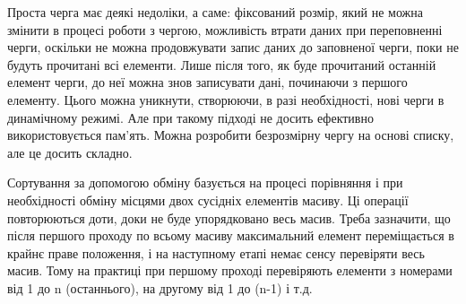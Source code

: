 \documentclass[a4paper,14pt]{extreport}
\begin{document}
Проста черга має деякі недоліки, а саме: фіксований розмір, який не можна змінити в процесі роботи з чергою, можливість втрати даних при переповненні черги, оскільки не можна продовжувати запис даних до заповненої черги, поки не будуть прочитані всі елементи. Лише після того, як буде прочитаний останній елемент черги, до неї можна знов записувати дані, починаючи з першого елементу. Цього можна уникнути, створюючи, в разі необхідності, нові черги в динамічному режимі. Але при такому підході не досить ефективно використовується пам’ять. Можна розробити безрозмірну чергу на основі списку, але це досить складно.

\begin{center}
\end{center}
Сортування за допомогою обміну базується на процесі порівняння і при необхідності обміну місцями двох сусідніх елементів масиву. Ці операції повторюються доти, доки не буде упорядковано весь масив. Треба зазначити, що після першого проходу по всьому масиву максимальний елемент переміщається в крайнє праве положення, і на наступному етапі немає сенсу перевіряти весь масив. Тому на практиці при першому проході перевіряють елементи з номерами від 1 до n (останнього), на другому від 1 до (n-1) і т.д.
\end{document}
